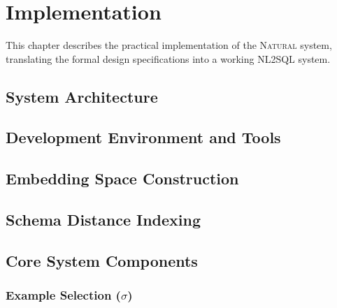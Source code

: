 \section{Implementation}

This chapter describes the practical implementation of the \textsc{Natural} system,
translating the formal design specifications into a working NL2SQL system.

\subsection{System Architecture}

\subsection{Development Environment and Tools}

\subsection{Embedding Space Construction}

\subsection{Schema Distance Indexing}

\subsection{Core System Components}

\subsubsection{Example Selection ($\sigma$)}

